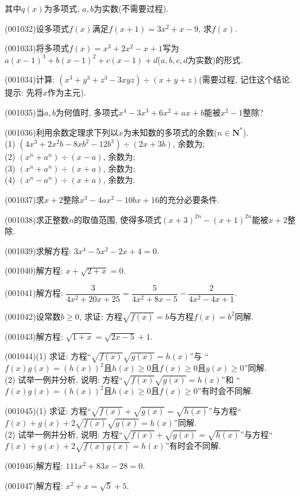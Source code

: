 其中$q(x)$为多项式, $a,b$为实数(不需要过程).
\item (001032)设多项式$f(x)$满足$f(x+1)=3x^2+x-9$, 求$f(x)$.
\item (001033)将多项式$f(x)=x^3+2x^2-x+1$写为$a(x-1)^3+b(x-1)^2+c(x-1)+d$($a,b,c,d$为实数)的形式.
\item (001034)计算: $(x^3+y^3+z^3-3xyz)\div(x+y+z)$(需要过程, 记住这个结论. 提示: 先将$x$作为主元).
\item (001035)当$a,b$为何值时, 多项式$x^4-3x^3+6x^2+ax+b$能被$x^2-1$整除?
\item (001036)利用余数定理求下列以$x$为未知数的多项式的余数($n \in\mathbf{N}^*$).\\ 
(1) $(4x^3+2x^2b-8xb^2-12b^3)\div (2x+3b)$, 余数为;\\ 
(2) $(x^n+a^n)\div (x-a)$, 余数为;\\ 
(3) $(x^n+a^n)\div (x+a)$, 余数为;\\ 
(4) $(x^n-a^n)\div (x+a)$, 余数为.
\item (001037)求$x+2$整除$x^3-4ax^2-10bx+16$的充分必要条件.
\item (001038)求正整数$n$的取值范围, 使得多项式$(x+3)^{2n}-(x+1)^{2n}$能被$x+2$整除.
\item (001039)求解方程: $3x^4-5x^2-2x+4=0$.
\item (001040)解方程: $x+\sqrt{2+x}=0$.
\item (001041)解方程: $\dfrac{3}{4x^2+20x+25}=\dfrac{5}{4x^2+8x-5}-\dfrac{2}{4x^2-4x+1}$.
\item (001042)设常数$b\geq 0$, 求证: 方程$\sqrt{f(x)}=b$与方程$f(x)=b^2$同解.
\item (001043)解方程: $\sqrt{1+x}=\sqrt{2x-5}+1$.
\item (001044)(1) 求证: 方程``$\sqrt{f(x)}\sqrt{g(x)}=h(x)$''与
``$f(x)g(x)=(h(x))^2$且$h(x)\geq 0$且$f(x)\geq 0$且$g(x)\geq 0$''同解.\\ 
(2) 试举一例并分析, 说明: 方程``$\sqrt{f(x)}\sqrt{g(x)}=h(x)$''和
``$f(x)g(x)=(h(x))^2$且$h(x)\geq 0$且$f(x)\geq 0$''有时会不同解.
\item (001045)(1) 求证: 方程``$\sqrt{f(x)}+\sqrt{g(x)}=\sqrt{h(x)}$''与方程``$f(x)+g(x)+2\sqrt{f(x)}\sqrt{g(x)}=h(x)$''同解.\\ 
(2) 试举一例并分析, 说明: 方程``$\sqrt{f(x)}+\sqrt{g(x)}=\sqrt{h(x)}$''与方程``$f(x)+g(x)+2\sqrt{f(x)g(x)}=h(x)$''有时会不同解.
\item (001046)解方程: $111x^2+83x-28=0$.
\item (001047)解方程: $x^2+x=\sqrt{5}+5$.
